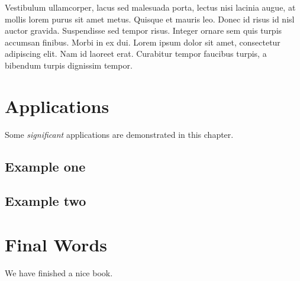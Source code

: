 \documentclass[
  12pt,
  a4paper,
  oneside]{book}
\begin{document}
Vestibulum ullamcorper, lacus sed malesuada porta, lectus nisi lacinia augue, at mollis lorem purus sit amet metus. Quisque et mauris leo. Donec id risus id nisl auctor gravida. Suspendisse sed tempor risus. Integer ornare sem quis turpis accumsan finibus. Morbi in ex dui. Lorem ipsum dolor sit amet, consectetur adipiscing elit. Nam id laoreet erat. Curabitur tempor faucibus turpis, a bibendum turpis dignissim tempor.

\hypertarget{applications}{%
\chapter{Applications}\label{applications}}

Some \emph{significant} applications are demonstrated in this chapter.

\hypertarget{example-one}{%
\section{Example one}\label{example-one}}

\hypertarget{example-two}{%
\section{Example two}\label{example-two}}

\hypertarget{final-words}{%
\chapter{Final Words}\label{final-words}}

We have finished a nice book.

  
\end{document}
